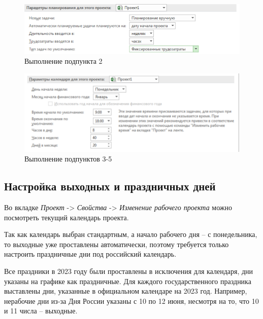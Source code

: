 \FloatBarrier
\begin{figure}[h]	
	\begin{center}
		\includegraphics[width=\linewidth]{inc/1-2.png}
	\end{center}
	\captionsetup{justification=centering}
	\caption{Выполнение подпункта 2}
\end{figure}
\FloatBarrier

\FloatBarrier
\begin{figure}[h]	
	\begin{center}
		\includegraphics[width=\linewidth]{inc/1-3.png}
	\end{center}
	\captionsetup{justification=centering}
	\caption{Выполнение подпунктов 3-5}
\end{figure}
\FloatBarrier


\subsection*{Настройка выходных и праздничных дней}
Во вкладке \textit{Проект} -> \textit{Свойства} -> \textit{Изменение рабочего проекта} можно посмотреть текущий календарь проекта.

Так как календарь выбран стандартным, а начало рабочего дня -- с понедельника, то выходные уже проставлены автоматически, поэтому требуется только настроить праздничные дни под российский календарь.

Все праздники в 2023 году были проставлены в исключения для календаря, дни указаны на графике как праздничные.
Для каждого государственного праздника выставлены дни, указанные в официальном календаре на 2023 год. 
Например, нерабочие дни из-за Дня России указаны с 10 по 12 июня, несмотря на то, что 10 и 11 числа -- выходные.

